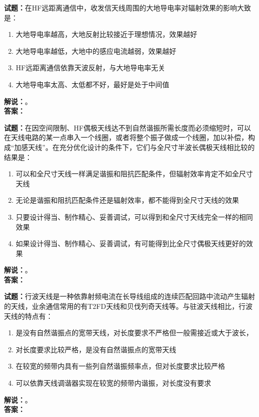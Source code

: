 \documentclass{ctexbook}
\begin{document}
\vspace{\baselineskip}

\noindent\textbf{试题：}在HF远距离通信中，收发信天线周围的大地导电率对辐射效果的影响大致是：
\begin{enumerate}[leftmargin=3em]
  \item 大地导电率越高，大地反射比较接近于理想情况，效果越好
  \item 大地导电率越低，大地中的感应电流越弱，效果越好
  \item HF远距离通信依靠天波反射，与大地导电率无关
  \item 大地导电率太高、太低都不好，最好是处于中间值
\end{enumerate}
\noindent\textbf{解说：}\textbf{}。\\\noindent\textbf{答案：}

\vspace{\baselineskip}

\noindent\textbf{试题：}在因空间限制、HF偶极天线达不到自然谐振所需长度而必须缩短时，可以在天线电路的某一点串入一个线圈，或者将整个振子做成一个线圈，加以补偿，构成“加感天线”。在充分优化设计的条件下，它们与全尺寸半波长偶极天线相比较的结果是：
\begin{enumerate}[leftmargin=3em]
  \item 可以和全尺寸天线一样满足谐振和阻抗匹配条件，但辐射效率肯定不如全尺寸天线
  \item 无论是谐振和阻抗匹配条件还是辐射效率，都不能得到全尺寸天线的效果
  \item 只要设计得当、制作精心、妥善调试，可以得到和全尺寸天线完全一样的相同效果
  \item 如果设计得当、制作精心、妥善调试，有可能得到比全尺寸偶极天线更好的效果
\end{enumerate}
\noindent\textbf{解说：}\textbf{}。\\\noindent\textbf{答案：}

\vspace{\baselineskip}

\noindent\textbf{试题：}行波天线是一种依靠射频电流在长导线组成的连续匹配回路中流动产生辐射的天线，业余通信常用的有T2FD天线和贝伐列奇天线等。与驻波天线相比，行波天线的特点有：
\begin{enumerate}[leftmargin=3em]
  \item 是没有自然谐振点的宽带天线，对长度要求不严格但一般需接近或大于波长，
  \item 对长度要求比较严格，是没有自然谐振点的宽带天线
  \item 在较宽的频带内具有一些列自然谐振频率点，但对长度要求比较严格
  \item 可以依靠天线调谐器实现在较宽的频带内谐振，对长度没有要求
\end{enumerate}
\noindent\textbf{解说：}\textbf{}。\\\noindent\textbf{答案：}
\end{document}
